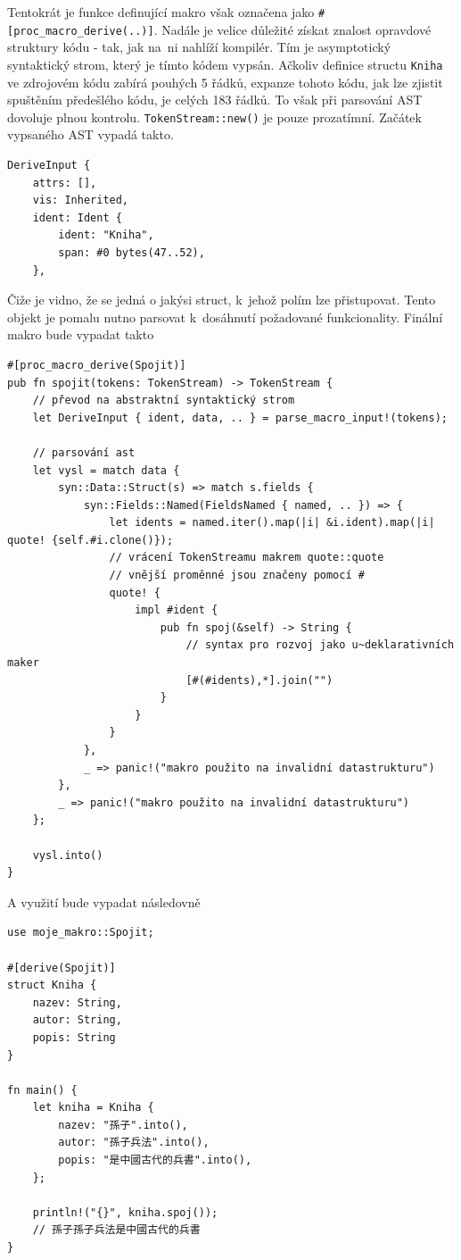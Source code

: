 \documentclass[a4paper, 12pt]{article} %
\newcommand{\rust}[1]{\texttt{#1}}
\begin{document}
			Tentokrát je funkce definující makro však označena jako \linebreak\texttt{\#[proc\_macro\_derive(..)]}. Nadále je velice důležité získat znalost opravdové struktury kódu - tak, jak na~ni nahlíží kompilér. Tím je asymptotický syntaktický strom, který je tímto kódem vypsán. Ačkoliv definice structu \rust{Kniha} ve zdrojovém kódu zabírá pouhých 5 řádků, expanze tohoto kódu, jak lze zjistit spuštěním předešlého kódu, je celých 183 řádků. To však při parsování AST dovoluje plnou kontrolu. \rust{TokenStream::new()} je pouze prozatímní. Začátek vypsaného AST vypadá takto.
			\begin{verbatim}
DeriveInput {
	attrs: [],
	vis: Inherited,
	ident: Ident {
		ident: "Kniha",
		span: #0 bytes(47..52),
	},
			\end{verbatim}
			
			Čiže je vidno, že se jedná o jakýsi struct, k~jehož polím lze přistupovat. Tento objekt je pomalu nutno parsovat k~dosáhnutí požadované funkcionality. Finální makro bude vypadat takto
			\begin{verbatim}
#[proc_macro_derive(Spojit)]
pub fn spojit(tokens: TokenStream) -> TokenStream {
	// převod na abstraktní syntaktický strom
	let DeriveInput { ident, data, .. } = parse_macro_input!(tokens);

	// parsování ast
	let vysl = match data {
		syn::Data::Struct(s) => match s.fields {
			syn::Fields::Named(FieldsNamed { named, .. }) => {
				let idents = named.iter().map(|i| &i.ident).map(|i| quote! {self.#i.clone()});
				// vrácení TokenStreamu makrem quote::quote
				// vnější proměnné jsou značeny pomocí #
				quote! {
					impl #ident {
						pub fn spoj(&self) -> String {
							// syntax pro rozvoj jako u~deklarativních maker
							[#(#idents),*].join("")
						}
					}
				}
			},
			_ => panic!("makro použito na invalidní datastrukturu")
		},
		_ => panic!("makro použito na invalidní datastrukturu")
	};

	vysl.into()
}
			\end{verbatim}
			
			A využití bude vypadat následovně
			\begin{verbatim}
use moje_makro::Spojit;

#[derive(Spojit)]
struct Kniha {
	nazev: String,
	autor: String,
	popis: String
}

fn main() {
	let kniha = Kniha {
		nazev: "孫子".into(),
		autor: "孫子兵法".into(),
		popis: "是中國古代的兵書".into(),
	};

	println!("{}", kniha.spoj());
	// 孫子孫子兵法是中國古代的兵書
}
			\end{verbatim}
			\cite{atrib_makro}
			
\end{document}
